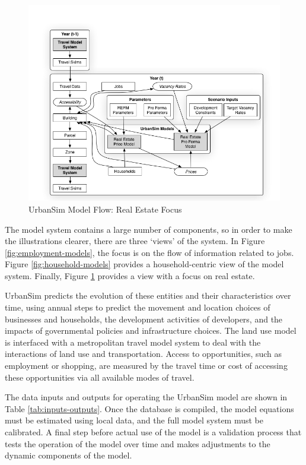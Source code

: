 \begin{figure}[ht]
\center
 \includegraphics[width=\textwidth]{graphics/ParcelRealEstateModel.png}
\caption{UrbanSim Model Flow: Real Estate Focus}
\label{fig:parcel-models}
\end{figure}

The model
system contains a large number of components, so in order to make the illustrations clearer,
there are three `views' of the system.  In Figure \ref{fig:employment-models}, the focus is on the
flow of information related to jobs.  Figure \ref{fig:household-models} provides a household-centric
view of the model system.  Finally, Figure \ref{fig:parcel-models} provides a view with a focus on
real estate.

UrbanSim predicts the evolution of these entities and their characteristics over time, using annual steps to predict the movement and location choices of businesses and households, the development activities of developers, and the impacts of governmental policies and infrastructure choices.  The land use model is interfaced with a metropolitan travel model system to deal with the interactions of land use and transportation. Access to opportunities, such as employment or shopping, are measured by the travel time or cost of accessing these opportunities via all available modes of travel.

The data inputs and outputs for operating the UrbanSim model are shown in Table \ref{tab:inputs-outputs}.  Once the database is compiled, the model equations must be estimated using local data, and the full model system must be calibrated.  A final step before actual use of the model is a validation process that tests the operation of the model over time and makes adjustments to the dynamic components of the model.  

